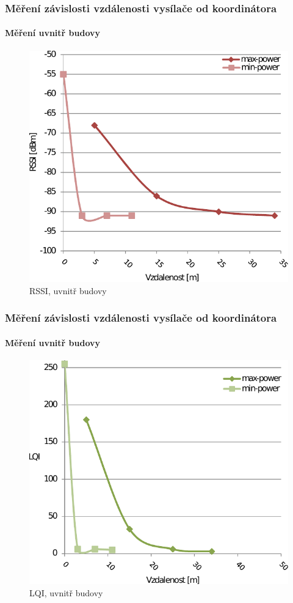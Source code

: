 \documentclass{beamer}
\begin{document}
	\begin{frame}
	\frametitle{Měření závislosti vzdálenosti vysílače od koordinátora}
	\framesubtitle{Měření uvnitř budovy}
	\begin{figure}[!ht]
	\centering%
	\includegraphics[scale=0.7, keepaspectratio]{2-rssi}%
	\caption{RSSI, uvnitř budovy}
	\end{figure}
	\end{frame}

	\begin{frame}
	\frametitle{Měření závislosti vzdálenosti vysílače od koordinátora}
	\framesubtitle{Měření uvnitř budovy}
	\begin{figure}[!ht]
	\centering%
	\includegraphics[scale=0.7, keepaspectratio]{2-lqi}%
	\caption{LQI, uvnitř budovy}
	\end{figure}
	\end{frame}
\end{document}
